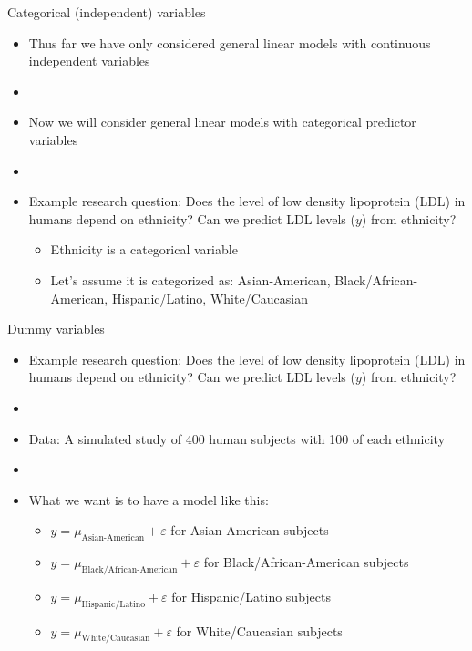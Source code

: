 \documentclass[xcolor=dvipsnames]{beamer}
\begin{document}
\begin{frame}{Categorical (independent) variables}
	\begin{itemize}
		\item Thus far we have only considered general linear models with continuous independent variables 
		\item[]
		\item Now we will consider general linear models with categorical predictor variables
		\item[]
		\item Example research question: Does the level of low density lipoprotein (LDL) in humans depend on ethnicity? Can we predict LDL levels ($y$) from ethnicity?
		\begin{itemize}
			\item Ethnicity is a categorical variable
			\item Let's assume it is categorized as: Asian-American, Black/African-American, Hispanic/Latino, White/Caucasian 
		\end{itemize}
	\end{itemize}
\end{frame}

\begin{frame}{Dummy variables}
	\begin{itemize}
		\item Example research question: Does the level of low density lipoprotein (LDL) in humans depend on ethnicity? Can we predict LDL levels ($y$) from ethnicity?
		\item[]
		\item Data: A simulated study of 400 human subjects with 100 of each ethnicity
		\item[]
		\item What we want is to have a model like this:
		\begin{itemize}
			\item $y = \mu_{\text{Asian-American}} + \varepsilon$ for Asian-American subjects
			\item $y = \mu_{\text{Black/African-American}} + \varepsilon$ for Black/African-American subjects
			\item $y = \mu_{\text{Hispanic/Latino}} + \varepsilon$ for Hispanic/Latino subjects
			\item $y = \mu_{\text{White/Caucasian}} + \varepsilon$ for White/Caucasian subjects
		\end{itemize}
	\end{itemize}
\end{frame}
\end{document}
